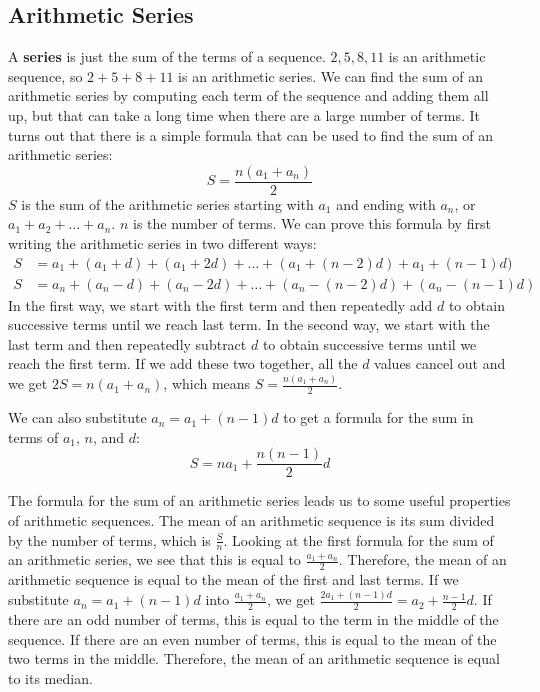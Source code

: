 \documentclass{article}
\begin{document}
    \subsection*{Arithmetic Series}
    A \textbf{series} is just the sum of the terms of a sequence. $2, 5, 8, 11$
    is an arithmetic sequence, so $2 + 5 + 8 + 11$ is an arithmetic series. We
    can find the sum of an arithmetic series by computing each term of the
    sequence and adding them all up, but that can take a long time when there
    are a large number of terms. It turns out that there is a simple formula
    that can be used to find the sum of an arithmetic series:
    \[S = \frac{n(a_1 + a_n)}{2}\] $S$ is the sum of the arithmetic series
    starting with $a_1$ and ending with $a_n$, or $a_1 + a_2 + \dots + a_n$. $n$
    is the number of terms. We can prove this formula by first writing the
    arithmetic series in two different ways:
    \begin{align*}
        S &= a_1 + (a_1 + d) + (a_1 + 2d) + \dots + (a_1 + (n - 2)d) + a_1 + (n - 1)d) \\
        S &= a_n + (a_n - d) + (a_n - 2d) + \dots + (a_n - (n - 2)d) + (a_n - (n - 1)d)
    \end{align*}
    In the first way, we start with the first term and then repeatedly add $d$
    to obtain successive terms until we reach last term. In the second way, we
    start with the last term and then repeatedly subtract $d$ to obtain
    successive terms until we reach the first term. If we add these two
    together, all the $d$ values cancel out and we get $2S = n(a_1 + a_n)$,
    which means $S = \frac{n(a_1 + a_n)}{2}$.

    We can also substitute $a_n = a_1 + (n - 1)d$ to get a formula for the sum
    in terms of $a_1$, $n$, and $d$:
    \[S = na_1 + \frac{n(n - 1)}{2}d\]

    The formula for the sum of an arithmetic series leads us to some useful
    properties of arithmetic sequences.  The mean of an arithmetic sequence is
    its sum divided by the number of terms, which is $\frac{S}{n}$. Looking at
    the first formula for the sum of an arithmetic series, we see that this is
    equal to $\frac{a_1 + a_n}{2}$. Therefore, the mean of an arithmetic
    sequence is equal to the mean of the first and last terms. If we substitute
    $a_n = a_1 + (n - 1)d$ into $\frac{a_1 + a_n}{2}$, we get $\frac{2a_1 + (n -
    1)d}{2} = a_2 + \frac{n - 1}{2}d$. If there are an odd number of terms, this
    is equal to the term in the middle of the sequence. If there are an even
    number of terms, this is equal to the mean of the two terms in the middle.
    Therefore, the mean of an arithmetic sequence is equal to its median.
\end{document}
